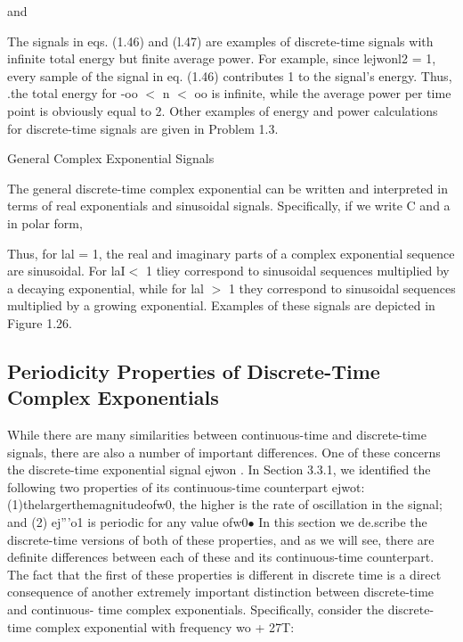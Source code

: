 \documentclass{report}
\begin{document}
and



The signals in eqs. (1.46) and (l.47) are examples of discrete-time signals with infinite total energy but finite average power. For example, since
lejwonl2 = 1, every sample of the signal in eq. (1.46) contributes 1 to the signal{'}s energy. Thus, .the total energy for -oo $<$ n $<$ oo is infinite,
while the average power per time point is obviously equal to 2. Other examples of energy and power calculations for discrete-time signals are given
in Problem 1.3.



General Complex Exponential Signals

The general discrete-time complex exponential can be written and interpreted in terms of real exponentials and sinusoidal signals. Specifically,
if we write C and a in polar form,









Thus, for lal = 1, the real and imaginary parts of a complex exponential sequence are sinusoidal. For laI$<$ 1 tliey correspond to sinusoidal sequences
multiplied by a decaying exponential, while for lal $>$ 1 they correspond to sinusoidal sequences multiplied by a growing exponential. Examples of
these signals are depicted in Figure 1.26.

\subsection*{Periodicity Properties of Discrete-Time Complex Exponentials}

While there are many similarities between continuous-time and discrete-time signals, there are also a number of important differences. One of these
concerns the discrete-time exponential signal ejwon . In Section 3.3.1, we identified the following two properties of its continuous-time counterpart
ejwot: (1)thelargerthemagnitudeofw0, the higher is the rate of oscillation in the signal; and (2) ej{''}{'}o1 is periodic for any value ofw0$\bullet
$ In this section we de.scribe the discrete-time versions of both of these properties, and as we will see, there are definite differences between
each of these and its continuous-time counterpart.\\
The fact that the first of these properties is different in discrete time is a direct consequence of another extremely important distinction between
discrete-time and continuous- time complex exponentials. Specifically, consider the discrete-time complex exponential with frequency wo + 27T:
\end{document}

